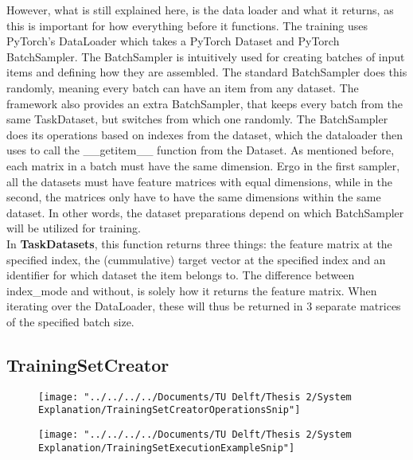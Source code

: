 However, what is still explained here, is the data loader and what it returns, as this is important for how everything before it functions. The training uses PyTorch's DataLoader which takes a PyTorch Dataset and PyTorch BatchSampler. The BatchSampler is intuitively used for creating batches of input items and defining how they are assembled. The standard BatchSampler does this randomly, meaning every batch can have an item from any dataset. The framework also provides an extra BatchSampler, that keeps every batch from the same TaskDataset, but switches from which one randomly. The BatchSampler does its operations based on indexes from the dataset, which the dataloader then uses to call the \_\_getitem\_\_ function from the Dataset. As mentioned before, each matrix in a batch must have the same dimension. Ergo in the first sampler, all the datasets must have feature matrices with equal dimensions, while in the second, the matrices only have to have the same dimensions within the same dataset. In other words, the dataset preparations depend on which BatchSampler will be utilized for training.\\

In \textbf{TaskDatasets}, this function returns three things: the feature matrix at the specified index, the (cummulative) target vector at the specified index and an identifier for which dataset the item belongs to. The difference between index\_mode and without, is solely how it returns the feature matrix. When iterating over the DataLoader, these will thus be returned in 3 separate matrices of the specified batch size. \\


\subsection{TrainingSetCreator}

\begin{figure}
	\centering
	\texttt{[image: "../../../../Documents/TU Delft/Thesis 2/System Explanation/TrainingSetCreatorOperationsSnip"]}
	\caption{}
	\label{fig:trainingsetcreatoroperationssnip}
\end{figure}

\begin{figure}
	\centering
	\texttt{[image: "../../../../Documents/TU Delft/Thesis 2/System Explanation/TrainingSetExecutionExampleSnip"]}
	\caption{}
	\label{fig:trainingsetexecutionexamplesnip}
\end{figure}


